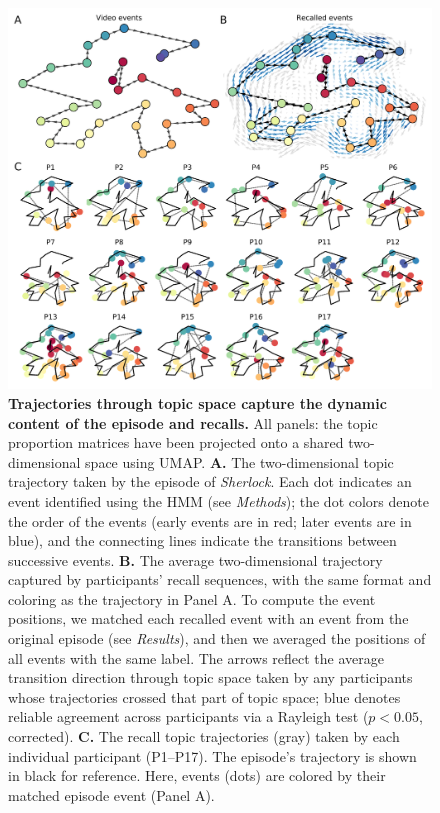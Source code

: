 \documentclass[10pt]{article}
\begin{document}
\begin{figure}[tp]
\centering
\includegraphics[width=1\textwidth]{figs/trajectory}
\caption{\small \textbf{Trajectories through topic space capture the dynamic content of the episode and recalls.}  All panels: the topic proportion matrices have been projected onto a shared two-dimensional space using UMAP.  \textbf{A.} The two-dimensional topic trajectory taken by the episode of \textit{Sherlock}.  Each dot indicates an event identified using the HMM (see \textit{Methods}); the dot colors denote the order of the events (early events are in red; later events are in blue), and the connecting lines indicate the transitions between successive events.  \textbf{B.} The average two-dimensional trajectory captured by participants' recall sequences, with the same format and coloring as the trajectory in Panel A.  To compute the event positions, we matched each recalled event with an event from the original episode (see \textit{Results}), and then we averaged the positions of all events with the same label.  The arrows reflect the average transition direction through topic space taken by any participants whose trajectories crossed that part of topic space; blue denotes reliable agreement across participants via a Rayleigh test ($p < 0.05$, corrected).  \textbf{C.} The recall topic trajectories (gray) taken by each individual participant (P1--P17).  The episode's trajectory is shown in black for reference.  Here, events (dots) are colored by their matched episode event (Panel A).}
\label{fig:trajectory}
\end{figure}
\end{document}
